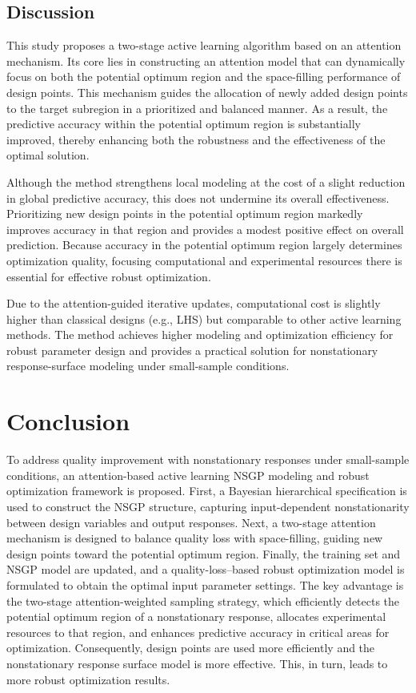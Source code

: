 \documentclass[]{interact}
\theoremstyle{plain}%
\theoremstyle{definition}
\theoremstyle{remark}
\begin{document}
\subsection{Discussion}
This study proposes a two-stage active learning algorithm based on an attention mechanism. Its core lies in constructing an attention model that can dynamically focus on both the potential optimum region and the space-filling performance of design points. This mechanism guides the allocation of newly added design points to the target subregion in a prioritized and balanced manner. As a result, the predictive accuracy within the potential optimum region is substantially improved, thereby enhancing both the robustness and the effectiveness of the optimal solution.

Although the method strengthens local modeling at the cost of a slight reduction in global predictive accuracy, this does not undermine its overall effectiveness. Prioritizing new design points in the potential optimum region markedly improves accuracy in that region and provides a modest positive effect on overall prediction. Because accuracy in the potential optimum region largely determines optimization quality, focusing computational and experimental resources there is essential for effective robust optimization.

Due to the attention-guided iterative updates, computational cost is slightly higher than classical designs (e.g., LHS) but comparable to other active learning methods. The method achieves higher modeling and optimization efficiency for robust parameter design and provides a practical solution for nonstationary response-surface modeling under small-sample conditions.

\section{Conclusion}
To address quality improvement with nonstationary responses under small-sample conditions, an attention-based active learning NSGP modeling and robust optimization framework is proposed. First, a Bayesian hierarchical specification is used to construct the NSGP structure, capturing input-dependent nonstationarity between design variables and output responses. Next, a two-stage attention mechanism is designed to balance quality loss with space-filling, guiding new design points toward the potential optimum region. Finally, the training set and NSGP model are updated, and a quality-loss–based robust optimization model is formulated to obtain the optimal input parameter settings. The key advantage is the two-stage attention-weighted sampling strategy, which efficiently detects the potential optimum region of a nonstationary response, allocates experimental resources to that region, and enhances predictive accuracy in critical areas for optimization. Consequently, design points are used more efficiently and the nonstationary response surface model is more effective. This, in turn, leads to more robust optimization results.
\end{document}
